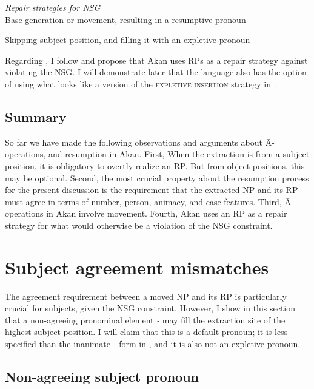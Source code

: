 \documentclass[output=paper]{LSP/langsci}
\begin{document}
  
\ea\label{ex:korsah:14} \textit{Repair strategies for NSG} \citep[see][]{RnS07} \\
\ea\label{ex:korsah:14a}
Base-generation or movement, resulting in a resumptive pronoun

\ex\label{ex:korsah:14b} 
Skipping subject position, and filling it with an expletive pronoun
\z
\z

Regarding , I follow \cite{Shlonsky92} and propose that Akan uses RPs as a repair strategy against violating the NSG. I will demonstrate later that the language also has the option of using what looks like a version of the \textsc{expletive insertion} strategy in .

  
   
\subsection{Summary}\label{sec:korsah:2.4}

So far we have made the following observations and arguments about \=A-opera\-tions, and resumption in Akan. First, When the extraction is from a subject position,  it is obligatory to  overtly realize an RP. But from object positions, this may be optional. Second, the most crucial property about the resumption process for the present discussion is the requirement that the extracted NP and its RP must agree in terms of number, person, animacy, and case features. Third, \=A-operations in Akan involve movement. Fourth, Akan uses an RP  as a repair strategy for what would otherwise be a violation of the NSG constraint.
   
\section{Subject agreement mismatches}\label{sec:korsah:3}
  
The agreement requirement between a moved NP and its RP is particularly crucial for subjects, given the NSG constraint. However, I show in this section that a non-agreeing pronominal element \textit{\eer-} may fill the extraction site of the highest subject position. I will claim that this is a default pronoun; it is less specified than the inanimate \textit{\eer-} form in , and it is also not an expletive pronoun.
  
\subsection{Non-agreeing subject pronoun}\label{ex:korsah:3.1}
\end{document}
